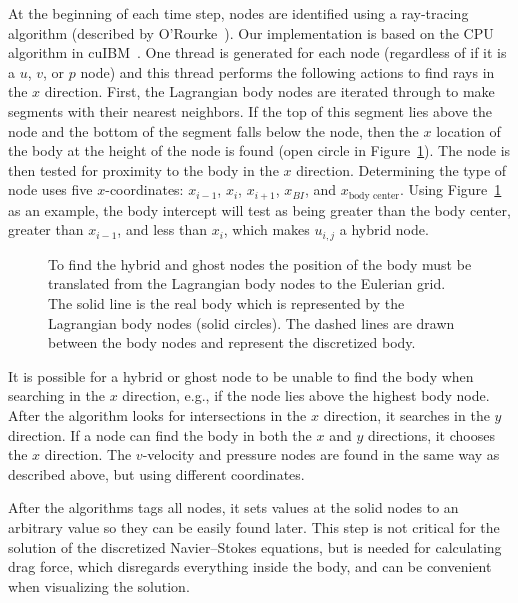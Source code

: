 \documentclass[preprint,12pt]{elsarticle}
\begin{document}
At the beginning of each time step, nodes are identified using a ray-tracing algorithm (described by O'Rourke~\cite{o1998computational}).
Our implementation is based on the CPU algorithm in cuIBM~\cite{krishnan2012validation,Krishnan2017}.
One thread is generated for each node (regardless of if it is a $u$, $v$, or $p$ node) and this thread performs the following actions to find rays in the $x$ direction.
First, the Lagrangian body nodes are iterated through to make segments with their nearest neighbors.
If the top of this segment lies above the node and the bottom of the segment falls below the node, then the $x$ location of the body at the height of the node is found (open circle in Figure~\ref{fig:node id 1}).
The node is then tested for proximity to the body in the $x$ direction.
Determining the type of node uses five $x$-coordinates: $x_{i-1}$, $x_{i}$, $x_{i+1}$, $x_{BI}$, and $x_{\text{body center}}$.
Using Figure~\ref{fig:node id 1} as an example, the body intercept will test as being greater than the body center, greater than $x_{i-1}$, and less than $x_{i}$, which makes $u_{i,j}$ a hybrid node.

\begin{figure}[htbp]
	\centering
	
	\caption{To find the hybrid and ghost nodes the position of the body must be translated from the Lagrangian body nodes to the Eulerian grid. The solid line is the real body which is represented by the Lagrangian body nodes (solid circles). The dashed lines are drawn between the body nodes and represent the discretized body.}
	\label{fig:node id 1}
\end{figure}

It is possible for a hybrid or ghost node to be unable to find the body when searching in the $x$ direction, e.g., if the node lies above the highest body node.
After the algorithm looks for intersections in the $x$ direction, it searches in the $y$ direction.
If a node can find the body in both the $x$ and $y$ directions, it chooses the $x$ direction.
The $v$-velocity and pressure nodes are found in the same way as described above, but using different coordinates.

After the algorithms tags all nodes, it sets values at the solid nodes to an arbitrary value so they can be easily found later.
This step is not critical for the solution of the discretized Navier--Stokes equations, but is needed for calculating drag force, which disregards everything inside the body, and can be convenient when visualizing the solution.
\end{document}
